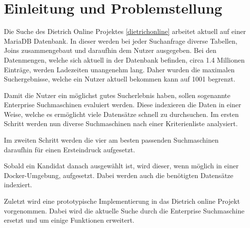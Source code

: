\chapter{Einleitung und Problemstellung}


Die Suche des Dietrich Online Projektes \ref{dietrichonline} arbeitet aktuell auf einer MariaDB Datenbank. In dieser werden bei jeder Suchanfrage diverse Tabellen, Joins zusammengebaut und daraufhin dem Nutzer ausgegeben. Bei den Datenmengen, welche sich aktuell in der Datenbank befinden, circa 1.4 Millionen Einträge, werden Ladezeiten unangenehm lang. Daher wurden die maximalen Suchergebnisse, welche ein Nutzer aktuell bekommen kann auf 1001 begrenzt. 

Damit die Nutzer ein möglichst gutes Sucherlebnis haben, sollen sogenannte Enterprise Suchmaschinen evaluiert werden. Diese indexieren die Daten in einer Weise, welche es ermöglicht viele Datensätze schnell zu durchsuchen. Im ersten Schritt werden nun diverse Suchmaschinen nach einer Kriterienliste analysiert.

Im zweiten Schritt werden die vier am besten passenden Suchmaschinen daraufhin für einen Ersteindruck aufgesetzt.

Sobald ein Kandidat danach ausgewählt ist, wird dieser, wenn möglich in einer Docker-Umgebung, aufgesetzt. Dabei werden auch die benötigten Datensätze indexiert.

Zuletzt wird eine prototypische Implementierung in das Dietrich online Projekt vorgenommen. Dabei wird die aktuelle Suche durch die Enterprise Suchmaschine ersetzt und um einige Funktionen erweitert. 